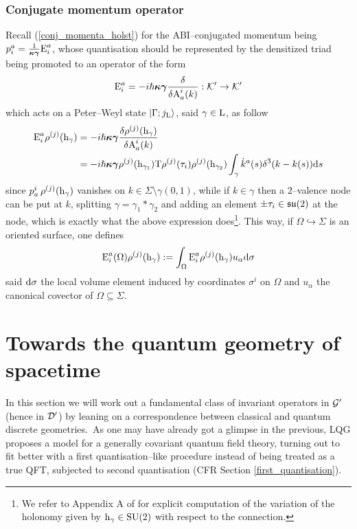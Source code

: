 \subsubsection{Conjugate momentum operator}

Recall (\ref{conj_momenta_holst}) for the ABI--conjugated momentum being $p^a_i=\frac{1}{\boldsymbol{\kappa\gamma}}\text{\normalfont E}^a_i$, whose quantisation should be represented by the densitized triad being promoted to an operator of the form
$$\text{\normalfont E}^a_i=-i\hslash\boldsymbol{\kappa\gamma}\frac{\delta}{\delta\text{\normalfont A}^i_a(k)}:\mathcal{K}'\to\mathcal{K}'$$
which acts on a Peter--Weyl state $\left| \Gamma;j_{\text{\normalfont L}} \right >$, said $\gamma\in\text{\normalfont L}$, as follow
\begin{align*}
    \text{\normalfont E}^a_i\rho^{(j)}(\text{\normalfont h}_\gamma)&=-i\hslash\boldsymbol{\kappa\gamma}\frac{\delta\rho^{(j)}(\text{\normalfont h}_\gamma)}{\delta\text{\normalfont A}^i_a(k)}\\
    &=-i\hslash\boldsymbol{\kappa\gamma}\rho^{{(j)}}(\text{\normalfont h}_{\gamma_1})\text{\normalfont T}\rho^{(j)}(\tau_i)\rho^{(j)}(\text{\normalfont h}_{\gamma_2})\int_\gamma{\dot{k}^a(s)\delta^3(k-k(s))}\text{\normalfont d} s
\end{align*}
since $p^i_a\,\rho^{(j)}(\text{\normalfont h}_\gamma)$ vanishes on $k\in\Sigma\setminus\gamma(0,1)$, while if $k\in\gamma$ then a $2$--valence node can be put at $k$, splitting $\gamma=\gamma_1*\gamma_2$ and adding an element $\pm\tau_i\in\mathfrak{su}(2)$ at the node, which is exactly what the above expression does\footnote{We refer to Appendix A of \cite{LN5} for explicit computation of the variation of the holonomy given by $\text{\normalfont h}_\gamma\in\text{\normalfont SU}(2)$ with respect to the connection.}. This way, if $\Omega\hookrightarrow\Sigma$ is an oriented surface, one defines
$$\text{\normalfont E}^a_i(\Omega)\rho^{(j)}(\text{\normalfont h}_\gamma):=\int_\Omega\text{\normalfont E}^a_i\rho^{(j)}(\text{\normalfont h}_\gamma) u_\alpha\text{\normalfont d}\sigma$$
said $\text{\normalfont d}\sigma$ the local volume element induced by coordinates $\sigma^i$ on $\Omega$ and $u_\alpha$ the canonical covector of $\Omega\subseteq\Sigma$. %





\newpage
\section{Towards the quantum geometry of spacetime}
In this section we will work out a fundamental class of invariant operators in $\mathcal{G}'$ (hence in $\mathcal{D}'$) by leaning on a correspondence between classical and quantum discrete geometries.\, As one may have already got a glimpse in the previous, LQG proposes a model for a generally covariant quantum field theory, turning out to fit better with a first quantisation--like procedure instead of being treated as a true QFT, subjected to second quantisation (CFR Section \ref{first_quantisation}). 

